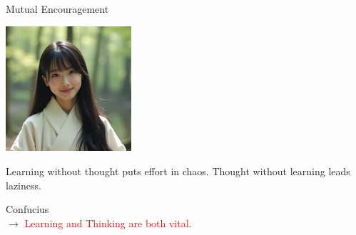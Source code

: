\documentclass{beamer}
\begin{document}
\begin{frame}{Mutual Encouragement}
\begin{center}
\includegraphics[width=0.35\textwidth]{mc.png}
\end{center}
\begin{center}
Learning without thought puts effort in chaos. Thought without learning leads laziness.
\end{center}
\flushright Confucius \\
\flushleft $\rightarrow$ \textcolor{red}{Learning and Thinking are both vital}.
\end{frame}
\end{document}
